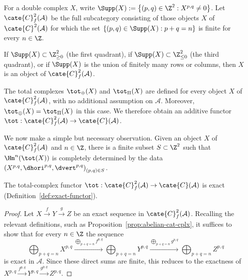 \begin{definition}\label{def:Cf-Supp}
	For a double complex $X$, write
	$\Supp(X) := \left\{ (p,q) \in \Z^2 : X^{p,q} \neq 0 \right\}$.
	Let $\cate{C}^2_f(\mathcal{A})$ be the full subcategory consisting of
	those objects $X$ of $\cate{C}^2(\mathcal{A})$ for which the set
	$\{(p,q)\in\Supp(X):p+q=n\}$ is finite for every $n\in\Z$.
\end{definition}

\begin{example}
	If $\Supp(X)\subset\Z_{\geq 0}^2$ (the first quadrant), if
	$\Supp(X)\subset\Z_{\leq 0}^2$ (the third quadrant), or if $\Supp(X)$
	is the union of finitely many rows or columns, then $X$ is an object of
	$\cate{C}^2_f(\mathcal{A})$.
\end{example}

The total complexes $\tot_{\oplus}(X)$ and $\tot_{\Pi}(X)$ are defined for
every object $X$ of $\cate{C}^2_f(\mathcal{A})$, with no additional assumption
on $\mathcal{A}$. Moreover, $\tot_{\oplus}(X)=\tot_{\Pi}(X)$ in this case.
We therefore obtain an additive functor
$\tot:\cate{C}^2_f(\mathcal{A})\to\cate{C}(\mathcal{A})$.

We now make a simple but necessary observation. Given an object $X$ of
$\cate{C}^2_f(\mathcal{A})$ and $n\in\Z$, there is a finite subset
$S\subset\Z^2$ such that $\Hm^n(\tot(X))$ is completely determined by the
data $\left(X^{p,q},\dhori^{p,q},\dvert^{p,q}\right)_{(p,q)\in S}$.

\begin{lemma}\label{prop:tot-exact}
	The total-complex functor
	$\tot:\cate{C}^2_f(\mathcal{A})\to\cate{C}(\mathcal{A})$ is exact
	(Definition~\ref{def:exact-functor}).
\end{lemma}
\begin{proof}
	Let $X\xrightarrow{f}Y\xrightarrow{g}Z$ be an exact sequence in
	$\cate{C}^2_f(\mathcal{A})$. Recalling the relevant definitions, such as
	Proposition~\ref{prop:abelian-cat-cplx}, it suffices to show that for every
	$n\in\Z$ the sequence
	\[ \bigoplus_{p+q=n} X^{p,q} \xrightarrow{\bigoplus_{p+q=n} f^{p,q}} \bigoplus_{p+q=n} Y^{p,q} \xrightarrow{\bigoplus_{p+q=n} g^{p,q}} \bigoplus_{p+q=n} Z^{p,q} \]
	is exact in $\mathcal{A}$. Since these direct sums are finite, this reduces
	to the exactness of
	$X^{p,q}\xrightarrow{f^{p,q}}Y^{p,q}\xrightarrow{g^{p,q}}Z^{p,q}$.
\end{proof}


